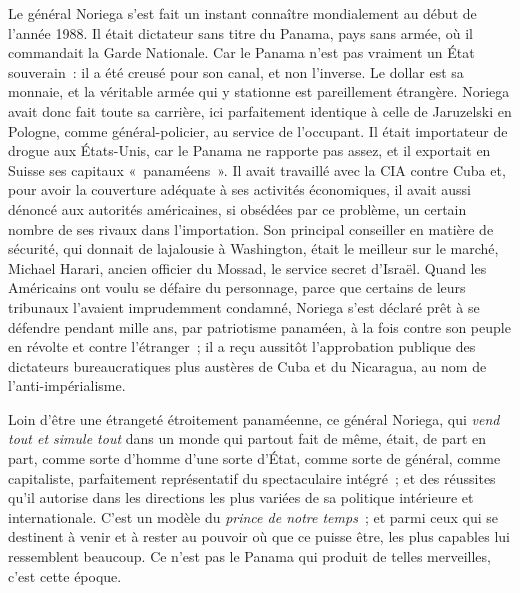 \documentclass[french,twoside]{book} %
\def\bignobreak{\ifdim\lastskip<\bigskipamount
  \removelastskip\nopagebreak\bigskip\fi}
\newcommand{\labelblock}[1]{\bigbreak{\color{rubric}\noindent\textbf{#1}\par}\bignobreak}
\begin{document}
\noindent Le général Noriega s’est fait un instant connaître mondialement au début de l’année 1988. Il était dictateur sans titre du Panama, pays sans armée, où il commandait la Garde Nationale. Car le Panama n’est pas vraiment un État souverain : il a été creusé pour son canal, et non l’inverse. Le dollar est sa monnaie, et la véritable armée qui y stationne est pareillement étrangère. Noriega avait donc fait toute sa carrière, ici parfaitement identique à celle de Jaruzelski en Pologne, comme général-policier, au service de l’occupant. Il était importateur de drogue aux États-Unis, car le Panama ne rapporte pas assez, et il exportait en Suisse ses capitaux « panaméens ». Il avait travaillé avec la CIA contre Cuba et, pour avoir la couverture adéquate à ses activités économiques, il avait aussi dénoncé aux autorités américaines, si obsédées par ce problème, un certain nombre de ses rivaux dans l’importation. Son principal conseiller en matière de sécurité, qui donnait de lajalousie à Washington, était le meilleur sur le marché, Michael Harari, ancien officier du Mossad, le service secret d’Israël. Quand les Américains ont voulu se défaire du personnage, parce que certains de leurs tribunaux l’avaient imprudemment condamné, Noriega s’est déclaré prêt à se défendre pendant mille ans, par patriotisme panaméen, à la fois contre son peuple en révolte et contre l’étranger ; il a reçu aussitôt l’approbation publique des dictateurs bureaucratiques plus austères de Cuba et du Nicaragua, au nom de l’anti-impérialisme.\par
Loin d’être une étrangeté étroitement panaméenne, ce général Noriega, qui \emph{vend tout et simule tout} dans un monde qui partout fait de même, était, de part en part, comme sorte d’homme d’une sorte d’État, comme sorte de général, comme capitaliste, parfaitement représentatif du spectaculaire intégré ; et des réussites qu’il autorise dans les directions les plus variées de sa politique intérieure et internationale. C’est un modèle du \emph{prince de notre temps} ; et parmi ceux qui se destinent à venir et à rester au pouvoir où que ce puisse être, les plus capables lui ressemblent beaucoup. Ce n’est pas le Panama qui produit de telles merveilles, c’est cette époque.\par

\labelblock{XX}
\end{document}
